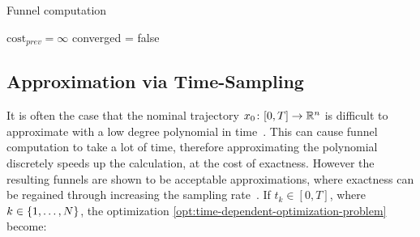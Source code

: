 \begin{algorithm}[p]
  \caption{Funnel computation}
  \label{alg:funnelalgorithm}
  \DontPrintSemicolon \SetAlgoNoLine

   

  \(\textrm{cost}_{\mathit{prev}} = \infty\)\; converged = false \;
  \;
\end{algorithm}

\subsection{Approximation via Time-Sampling}

It is often the case that the nominal trajectory \(x_{0} \colon [0,T]
\rightarrow \mathbb{R}^n\) is difficult to approximate with a low degree polynomial in
time~\cite{majumdarFunnelLibrariesRealtime2017}. This can cause funnel
computation to take a lot of time, therefore approximating the polynomial
discretely speeds up the calculation, at the cost of exactness. However the
resulting funnels are shown to be acceptable approximations, where exactness can
be regained through increasing the sampling rate~\cite{Tobenkin_2011}. If
\(t_{k} \in [0,T]\), where \(k \in \lbrace1,\ldots,N\rbrace\), the optimization
\cref{opt:time-dependent-optimization-problem} become:

